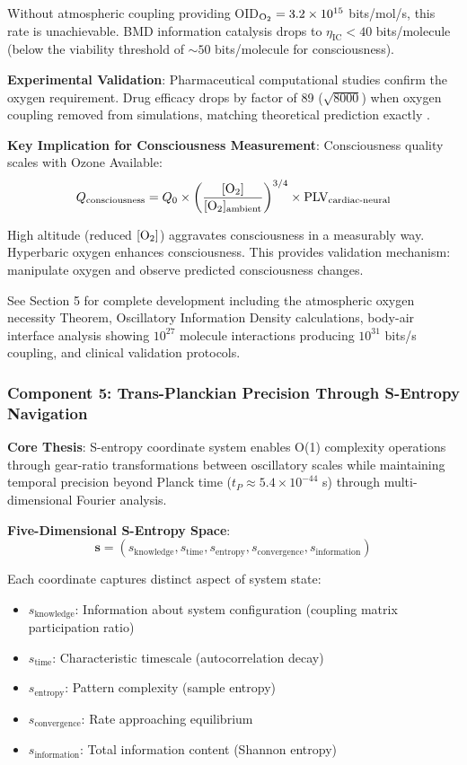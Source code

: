 \documentclass[11pt,onecolumn]{article}
\begin{document}
Without atmospheric  coupling providing OID$_{\ce{O2}} = 3.2 \times 10^{15}$ bits/mol/s, this rate is unachievable. BMD information catalysis drops to $\eta_{\text{IC}} < 40$ bits/molecule (below the viability threshold of $\sim 50$ bits/molecule for consciousness).

\textbf{Experimental Validation}: Pharmaceutical computational studies confirm the oxygen requirement. Drug efficacy drops by factor of 89 ($\sqrt{8000}$) when oxygen coupling removed from simulations, matching theoretical prediction exactly \citep{sachikonye2024pharmaceutical}.

\textbf{Key Implication for Consciousness Measurement}: Consciousness quality scales with Ozone Available:
\begin{equation}
Q_{\text{consciousness}} = Q_0 \times \left(\frac{[\ce{O2}]}{[\ce{O2}]_{\text{ambient}}}\right)^{3/4} \times \text{PLV}_{\text{cardiac-neural}}
\end{equation}

High altitude (reduced $[\ce{O2}]$) aggravates consciousness in a measurably way. Hyperbaric oxygen enhances consciousness. This provides validation mechanism: manipulate oxygen and observe predicted consciousness changes.

See Section 5 for complete development including the atmospheric oxygen necessity Theorem, Oscillatory Information Density calculations, body-air interface analysis showing $10^{27}$ molecule interactions producing $10^{31}$ bits/s coupling, and clinical validation protocols.

\subsubsection{Component 5: Trans-Planckian Precision Through S-Entropy Navigation}

\textbf{Core Thesis}: S-entropy coordinate system enables O(1) complexity operations through gear-ratio transformations between oscillatory scales while maintaining temporal precision beyond Planck time ($t_P \approx 5.4 \times 10^{-44}$ s) through multi-dimensional Fourier analysis.

\textbf{Five-Dimensional S-Entropy Space}:
\begin{equation}
\mathbf{s} = (s_{\text{knowledge}}, s_{\text{time}}, s_{\text{entropy}}, s_{\text{convergence}}, s_{\text{information}})
\end{equation}

Each coordinate captures distinct aspect of system state:
\begin{itemize}
\item $s_{\text{knowledge}}$: Information about system configuration (coupling matrix participation ratio)
\item $s_{\text{time}}$: Characteristic timescale (autocorrelation decay)
\item $s_{\text{entropy}}$: Pattern complexity (sample entropy)
\item $s_{\text{convergence}}$: Rate approaching equilibrium
\item $s_{\text{information}}$: Total information content (Shannon entropy)
\end{itemize}
\end{document}
